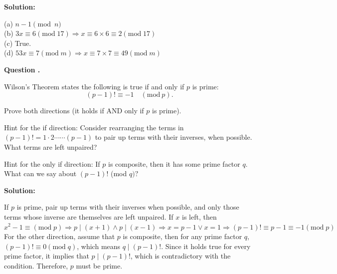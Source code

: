 \documentclass[12pt]{article}
\newcounter{questionnumber}
\newenvironment{question}[1][]{\stepcounter{questionnumber}\par\noindent\textbf{Question \thequestionnumber. #1}\par}{\par}
\newenvironment{solution}{\par\noindent\textbf{Solution:}\par}{\par\vspace{1em}}
\begin{document}
\begin{solution}
    \noindent
    (a) $n-1\pmod{n}$\\
    (b) $3x\equiv 6\left( \mathrm{mod}\;17 \right) \Longrightarrow x\equiv 6\times 6\equiv 2\left( \mathrm{mod}\;17 \right) $\\
    (c) True.\\
    (d) $53x\equiv 7\left( \mathrm{mod}\;m \right) \Longrightarrow x\equiv 7\times 7\equiv 49\left( \mathrm{mod}\;m \right) $
\end{solution}
\begin{question}
    Wilson's Theorem states the following is true if and only if $p$ is prime:
    \begin{equation*}
    (p-1)!\equiv-1\quad(\mathrm{mod~}p).
    \end{equation*}

    Prove both directions (it holds if AND only if $p$ is prime).

    Hint for the if direction: Consider rearranging the terms in $(p-1)!=1\cdot2\cdots\cdots(p-1)$ to pair up
    terms with their inverses, when possible. What terms are left unpaired?

    Hint for the only if direction: If $p$ is composite, then it has some prime factor $q.$ What can we say about $( p-1) !$ (mod $q) ?$
\end{question}
\begin{solution}
    If $p$ is prime, pair up terms with their inverses when possible, and only those terms whose inverse are themselves are left unpaired.
    If $x$ is left, then $x^2-1\equiv \left( \mathrm{mod}\;p \right) \Longrightarrow p\mid \left( x+1 \right) \land p\mid \left( x-1 \right) \Longrightarrow x=p-1\lor x=1\Longrightarrow \left( p-1 \right) !\equiv p-1\equiv -1\left( \mathrm{mod}\;p \right) $
    For the other direction, assume that $p$ is composite, then for any prime factor $q$, $\left( p-1 \right) !\equiv 0\left( \mathrm{mod}\;q \right) $, which means $q\mid \left( p-1 \right) !$.
    Since it holds true for every prime factor, it implies that $p\mid \left( p-1 \right) !$, which is contradictory with the condition.
    Therefore, $p$ must be prime.
\end{solution}
\end{document}
